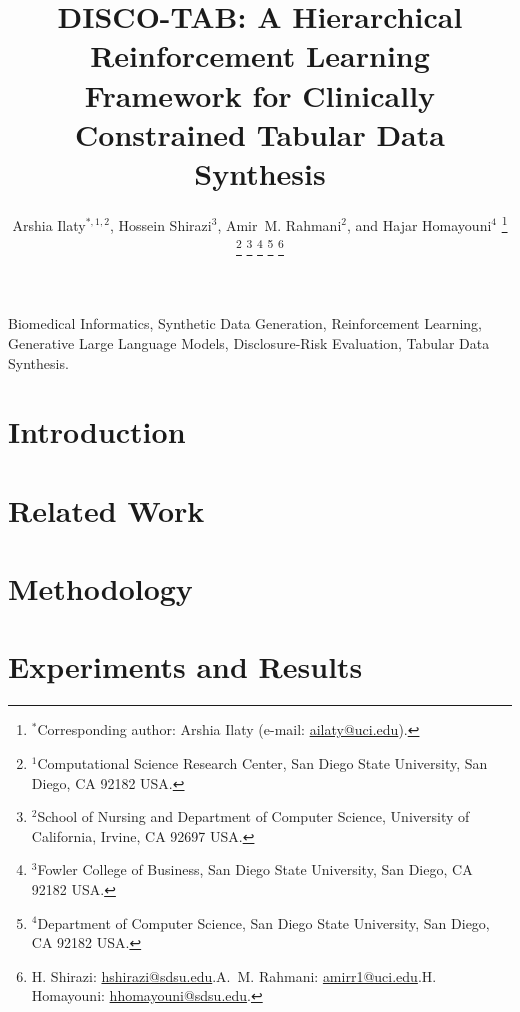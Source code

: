 \documentclass[journal,twoside,web]{ieeecolor}
\newcommand{\rev}[1]{#1}
\begin{document}
\title{DISCO-TAB: A Hierarchical Reinforcement Learning Framework for \rev{Clinically Constrained Tabular Data Synthesis}}

\author{Arshia Ilaty$^{*,1,2}$, Hossein Shirazi$^{3}$, Amir~M. Rahmani$^{2}$, and Hajar Homayouni$^{4}$%
\thanks{$^{*}$Corresponding author: Arshia Ilaty (e-mail: \href{mailto:ailaty@uci.edu}{ailaty@uci.edu}).}%
\thanks{$^{1}$Computational Science Research Center, San Diego State University, San Diego, CA 92182 USA.}%
\thanks{$^{2}$School of Nursing and Department of Computer Science, University of California, Irvine, CA 92697 USA.}%
\thanks{$^{3}$Fowler College of Business, San Diego State University, San Diego, CA 92182 USA.}%
\thanks{$^{4}$Department of Computer Science, San Diego State University, San Diego, CA 92182 USA.}%
\thanks{H. Shirazi: \href{mailto:hshirazi@sdsu.edu}{hshirazi@sdsu.edu}.\quad A.~M. Rahmani: \href{mailto:amirr1@uci.edu}{amirr1@uci.edu}.\quad H. Homayouni: \href{mailto:hhomayouni@sdsu.edu}{hhomayouni@sdsu.edu}.}}

\maketitle

\begin{abstract}

\end{abstract}

\begin{IEEEkeywords}
Biomedical Informatics, Synthetic Data Generation, Reinforcement Learning, Generative Large Language Models, \rev{Disclosure-Risk Evaluation}, Tabular Data Synthesis.
\end{IEEEkeywords}

\section{Introduction}\label{sec:introduction}


\section{Related Work}\label{sec:related_work}


\section{Methodology}\label{sec:methodology}


\section{Experiments and Results}\label{sec:experiments}

\end{document}
